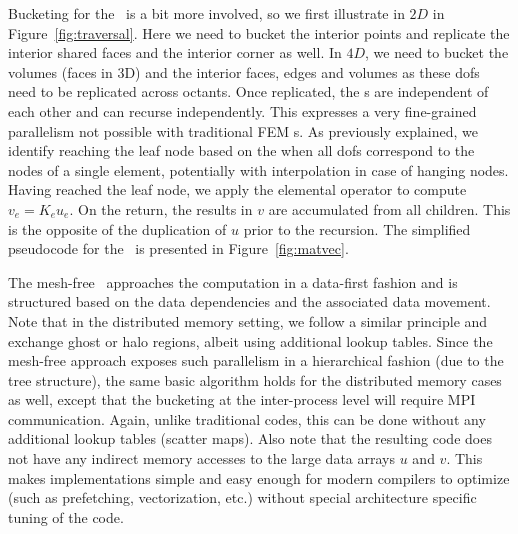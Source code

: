 Bucketing for the \mvec\ is a bit more involved, so we first illustrate in $2D$ in Figure~\ref{fig:traversal}. Here we need to bucket the interior points and replicate the interior shared faces and the interior corner as well. In $4D$, %
we need to bucket the volumes (faces in 3D) and the interior faces, edges and volumes as these dofs need to be replicated across octants. Once replicated, the \stra s are independent of each other and can recurse independently. This expresses a very fine-grained parallelism not possible with traditional FEM \mvec s. As previously explained, we identify reaching the leaf node based on the when all dofs correspond to the nodes of a single element, potentially with interpolation in case of hanging nodes. Having reached the leaf node, we apply the elemental operator %
to compute $v_e = K_e u_e$. On the return, the results in $v$ are accumulated from all children. This is the opposite of the duplication of $u$ prior to the recursion. The simplified pseudocode for the \mvec\ is presented in Figure~\ref{fig:matvec}. 

The mesh-free \mvec\ approaches the computation in a data-first fashion and is structured based on the data dependencies and the associated data movement. Note that in the distributed memory setting, we follow a similar principle and exchange ghost or halo regions, albeit using additional lookup tables. Since the mesh-free approach exposes such parallelism in a hierarchical fashion (due to the tree structure), the same basic algorithm holds for the distributed memory cases as well, except that the bucketing at the inter-process level will require {\textsc MPI} communication. Again, unlike traditional codes, this can be done without any additional lookup tables (scatter maps). Also note that the resulting code does not have any indirect memory accesses to the large data arrays $u$ and $v$. This makes implementations simple and easy enough for modern compilers to optimize (such as prefetching, vectorization, etc.) without special architecture specific tuning of the code. 

